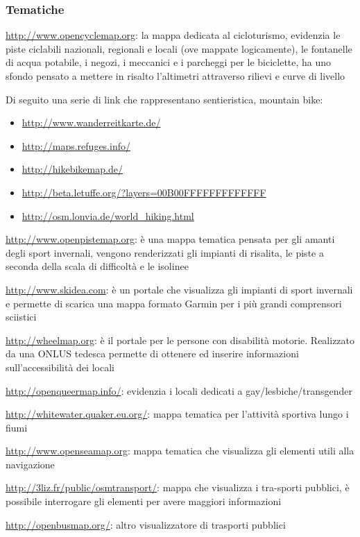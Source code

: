 \documentclass[a4paper,twoside,12pt,]{article}
\begin{document}
\subsubsection{Tematiche}
\url{http://www.opencyclemap.org}: la mappa dedicata al cicloturismo, evidenzia le piste ciclabili nazionali, regionali e locali (ove mappate logicamente), le fontanelle di acqua potabile, i negozi, i meccanici e i parcheggi per le biciclette, ha uno sfondo pensato a mettere in risalto l'altimetri attraverso rilievi e curve di livello

Di seguito una serie di link che rappresentano sentieristica, mountain bike:
\begin{itemize}
 \item \url{http://www.wanderreitkarte.de/}
 \item \url{http://maps.refuges.info/}
 \item \url{http://hikebikemap.de/}
 \item \url{http://beta.letuffe.org/?layers=00B00FFFFFFFFFFFFF}
 \item \url{http://osm.lonvia.de/world_hiking.html}
\end{itemize}

\url{http://www.openpistemap.org}: è una mappa tematica pensata per gli amanti degli sport invernali, vengono renderizzati gli impianti di risalita, le piste a seconda della scala di difficoltà e le isolinee

\url{http://www.skidea.com}: è un portale che visualizza gli impianti di sport invernali e permette di scarica una mappa formato Garmin per i più grandi comprensori sciistici

\url{http://wheelmap.org}: è il portale per le persone con disabilità motorie. Realizzato da una ONLUS tedesca permette di ottenere ed inserire informazioni sull'accessibilità dei locali

\url{http://openqueermap.info/}: evidenzia i locali dedicati a gay/lesbiche/transgender 

\url{http://whitewater.quaker.eu.org/}: mappa tematica per l'attività sportiva lungo i fiumi

\url{http://www.openseamap.org}: mappa tematica che visualizza gli elementi utili alla navigazione

\url{http://3liz.fr/public/osmtransport/}: mappa che visualizza i tra-sporti pubblici, è possibile interrogare gli elementi per avere maggiori informazioni

\url{http://openbusmap.org/}: altro visualizzatore di trasporti pubblici
\end{document}
